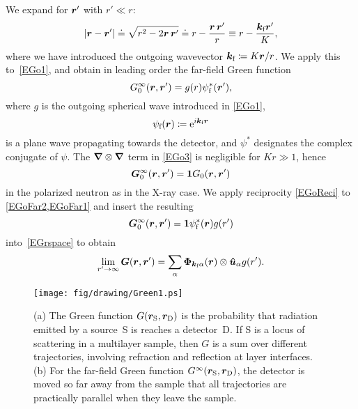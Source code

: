 We expand for $\bm{r}'$ with $r'\ll r$:
\begin{equation}
  \left|\bm{r}-\bm{r}'\right|
  \doteq \sqrt{r^2-2\bm{r}\,\bm{r}'}
  \doteq r - \frac{\bm{r}\,\bm{r}'}{r}
  \equiv r - \frac{{\bm{k}}_{\text{f}} \bm{r}'}{K},
\end{equation}
%
where we have introduced the outgoing wavevector
$  {\bm{k}}_{\text{f}}\coloneqq K \bm{r} / r$.
We apply this to~\cref{EGo1},
%
and obtain in leading order the far-field Green function
\begin{equation}\label{EGoFar1}
  G_0^\infty(\r,\r')
  = g(r)\psi^*_\sf(\r'),
\end{equation}
where $g$ is the outgoing spherical wave introduced in \cref{EGo1},
\begin{equation}%
  \psi_\sf(\r) \coloneqq  \e^{i\k_\sf \r}
\end{equation}
%
is a plane wave propagating towards the detector,
and $\psi^*$ designates the complex conjugate of $\psi$.
The $\bm{\nabla}\otimes\bm{\nabla}$ term in \cref{EGo3}
is negligible for $Kr\gg1$,
hence
\begin{equation}\label{EGoFar2}
  \TGo^\infty(\r,\r') = \v1 G_0(\r,\r')
\end{equation}
in the polarized neutron as in the X-ray case.
We apply reciprocity \cref{EGoReci}
to \cref{EGoFar2,EGoFar1} and insert the resulting
\begin{equation}
  \bm{G}_0^\infty(\bm{r},\bm{r}')=\bm{1}\psi^*_{\text{f}}(\bm{r})g(r')
\end{equation}
into~\cref{EGrspace} to obtain
%
\begin{equation}\label{EGresult}
  \lim_{r'\to\infty}\TG(\r,\r')
  = \sum_\alpha \v\Phi_{\k_\sf\alpha}(\r)\otimes \hu_\alpha g(r').
\end{equation}

\begin{figure}[tb]
\begin{center}
\texttt{[image: fig/drawing/Green1.ps]}
\end{center}
\caption{(a)
The Green function $G(\bm{r}_\text{S},\bm{r}_\text{D})$
%
is the probability that radiation emitted
by a source~S is reaches a detector~D.
If S is a locus of scattering in a multilayer sample,
then $G$ is a sum over different trajectories,
involving refraction and reflection
at layer interfaces.
(b) For the far-field
%
Green function $G^\infty(\bm{r}_\text{S},\bm{r}_\text{D})$,
the detector is moved so far away from the sample
that all trajectories are practically parallel when they leave the sample.}
\label{Fgreen1}
\end{figure}


